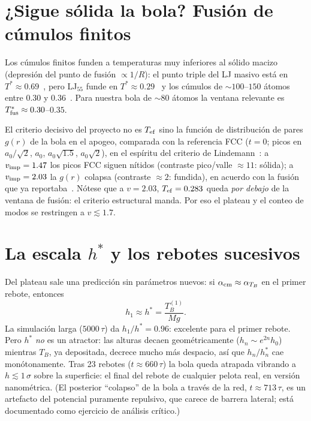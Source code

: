 \documentclass[11pt,a4paper]{article}
\begin{document}
\section{¿Sigue sólida la bola? Fusión de cúmulos finitos}
\label{sec:fusion}

Los cúmulos finitos funden a temperaturas muy inferiores al sólido macizo
(depresión del punto de fusión $\propto 1/R$): el punto triple del LJ masivo
está en $T^* \approx 0.69$~\cite{HansenVerlet1969}, pero LJ$_{55}$ funde en
$T^* \approx 0.29$~\cite{Labastie1990} y los cúmulos de $\sim100$--$150$
átomos entre $0.30$ y $0.36$~\cite{Labastie1990,Wales1997,Schmidt1998}. Para
nuestra bola de $\sim80$ átomos la ventana relevante es
$T^*_{\rm fus} \approx 0.30$--$0.35$.

El criterio decisivo del proyecto no es $T_{\rm ef}$ sino la función de
distribución de pares $g(r)$ de la bola en el apogeo, comparada con la
referencia FCC ($t=0$; picos en $a_0/\sqrt2$, $a_0$, $a_0\sqrt{1.5}$,
$a_0\sqrt2$), en el espíritu del criterio de
Lindemann~\cite{Lindemann1910}: a $v_{\rm imp}=1.47$ los picos FCC siguen
nítidos (contraste pico/valle $\approx11$: sólida); a $v_{\rm imp}=2.03$ la
$g(r)$ colapsa (contraste $\approx2$: fundida), en acuerdo con la fusión
que ya reportaba~\cite{Gutierrez2012}. Nótese que a $v=2.03$,
$T_{\rm ef}=0.283$ queda \emph{por debajo} de la ventana de fusión: el
criterio estructural manda. Por eso el plateau y el conteo de modos se
restringen a $v \lesssim 1.7$.

\section{La escala $h^*$ y los rebotes sucesivos}

Del plateau sale una predicción sin parámetros nuevos: si
$\alpha_{\rm cm} \approx \alpha_{T_B}$ en el primer rebote, entonces
\begin{equation}
h_1 \approx h^* = \frac{T_B^{(1)}}{Mg}.
\end{equation}
La simulación larga ($5000\,\tau$) da $h_1/h^* = 0.96$: excelente para el
primer rebote. Pero $h^*$ \emph{no} es un atractor: las alturas decaen
geométricamente ($h_n \sim e^{2n}h_0$) mientras $T_B$, ya depositada,
decrece mucho más despacio, así que $h_n/h^*_n$ cae monótonamente. Tras 23
rebotes ($t \approx 660\,\tau$) la bola queda atrapada vibrando a
$h \lesssim 1\,\sigma$ sobre la superficie: el final del rebote de
cualquier pelota real, en versión nanométrica. (El posterior ``colapso'' de
la bola a través de la red, $t\approx713\,\tau$, es un artefacto del
potencial puramente repulsivo, que carece de barrera lateral; está
documentado como ejercicio de análisis crítico.)
\end{document}
